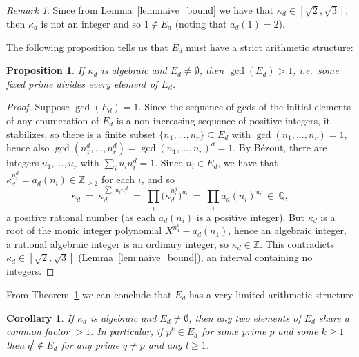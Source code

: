 \documentclass{article}
\theoremstyle{plain}
\newtheorem{proposition}[theorem]{Proposition}
\newtheorem{corollary}[theorem]{Corollary}
\theoremstyle{definition}
\theoremstyle{remark}
\newtheorem{remark}[theorem]{Remark}
\newcommand{\Z}{\mathbb{Z}}
\newcommand{\Q}{\mathbb{Q}}
\begin{document}
\begin{remark}\label{lem:1notin}
Since from Lemma~\ref{lem:naive_bound} we have that $\kappa_d \in [\sqrt{2}, \sqrt{3}]$, then $\kappa_d$ is not an integer and so $1\notin E_d$ (noting that $a_d(1)=2$).
\end{remark}

\noindent  The following proposition tells us that $E_d$ must have a strict arithmetic structure:

\begin{proposition}\label{thm:coprimality}
If $\kappa_d$ is algebraic and $E_d\ne\emptyset$, then $\gcd(E_d)>1$, i.e.\ some fixed prime divides every element of $E_d$.
\end{proposition}
\begin{proof}
Suppose $\gcd(E_d)=1$. Since the sequence of gcds of the initial elements of any enumeration of $E_d$ is a non-increasing sequence of positive integers, it stabilizes, so there is a finite subset $\{n_1,\dots,n_r\}\subseteq E_d$ with $\gcd(n_1,\dots,n_r)=1$, hence also $\gcd(n_1^d,\dots,n_r^d)=\gcd(n_1,\dots,n_r)^d=1$. By Bézout, there are integers $u_1,\dots,u_r$ with $\sum_iu_in_i^d=1$. Since $n_i\in E_d$, we have that $\kappa_d^{n_i^d}=a_d(n_i)\in\Z_{\ge2}$ for each $i$, and  so
\[
\kappa_d\ =\ \kappa_d^{\sum_iu_in_i^d}\ =\ \prod_i\big(\kappa_d^{n_i^d}\big)^{u_i}\ =\ \prod_i a_d(n_i)^{u_i}\ \in\ \Q,
\]
a positive rational number (as each $a_d(n_i)$ is a positive integer). But $\kappa_d$ is a root of the monic integer polynomial $X^{n_1^d}-a_d(n_1)$, hence an algebraic integer, a rational algebraic integer is an ordinary integer, so $\kappa_d\in\Z$. This contradicts $\kappa_d\in[\sqrt2,\sqrt3]$ (Lemma~\ref{lem:naive_bound}), an interval containing no integers.
\end{proof}

From Theorem~\ref{thm:coprimality} we can conclude that $E_d$ has a very limited arithmetic structure

\begin{corollary}\label{cor:pairwise}
If $\kappa_d$ is algebraic and $E_d \neq \emptyset$, then any two elements of $E_d$ share a common factor $>1$. In particular, if $p^k \in E_d$ for some prime $p$ and some $k \geq 1$ then $q^l \notin E_d$ for any prime $q \neq p$ and any $l \geq 1$. 
\end{corollary}


\end{document}
